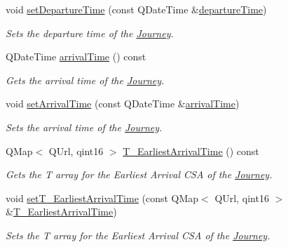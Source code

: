 \begin{DoxyCompactItemize}
void \mbox{\hyperlink{classQRail_1_1RouterEngine_1_1Journey_a4a03bbbfcbdc80e1d040598959ae4743}{set\+Departure\+Time}} (const Q\+Date\+Time \&\mbox{\hyperlink{classQRail_1_1RouterEngine_1_1Journey_a58b92b24d9d29ebb3cb47994b92eaa13}{departure\+Time}})
\begin{DoxyCompactList}\small\item\em Sets the departure time of the \mbox{\hyperlink{classQRail_1_1RouterEngine_1_1Journey}{Journey}}. \end{DoxyCompactList}\item 
Q\+Date\+Time \mbox{\hyperlink{classQRail_1_1RouterEngine_1_1Journey_a8a4e6733fceea2902fc3b0f5cb6b077c}{arrival\+Time}} () const
\begin{DoxyCompactList}\small\item\em Gets the arrival time of the \mbox{\hyperlink{classQRail_1_1RouterEngine_1_1Journey}{Journey}}. \end{DoxyCompactList}\item 
void \mbox{\hyperlink{classQRail_1_1RouterEngine_1_1Journey_aed24efbeb5390322b6b2bde3034cbe88}{set\+Arrival\+Time}} (const Q\+Date\+Time \&\mbox{\hyperlink{classQRail_1_1RouterEngine_1_1Journey_a8a4e6733fceea2902fc3b0f5cb6b077c}{arrival\+Time}})
\begin{DoxyCompactList}\small\item\em Sets the arrival time of the \mbox{\hyperlink{classQRail_1_1RouterEngine_1_1Journey}{Journey}}. \end{DoxyCompactList}\item 
Q\+Map$<$ Q\+Url, qint16 $>$ \mbox{\hyperlink{classQRail_1_1RouterEngine_1_1Journey_a2c6e80f1152cc373c95361db4fe295e4}{T\+\_\+\+Earliest\+Arrival\+Time}} () const
\begin{DoxyCompactList}\small\item\em Gets the T array for the Earliest Arrival C\+SA of the \mbox{\hyperlink{classQRail_1_1RouterEngine_1_1Journey}{Journey}}. \end{DoxyCompactList}\item 
void \mbox{\hyperlink{classQRail_1_1RouterEngine_1_1Journey_af477bba913bb4326528a2f9dcd2b2e82}{set\+T\+\_\+\+Earliest\+Arrival\+Time}} (const Q\+Map$<$ Q\+Url, qint16 $>$ \&\mbox{\hyperlink{classQRail_1_1RouterEngine_1_1Journey_a2c6e80f1152cc373c95361db4fe295e4}{T\+\_\+\+Earliest\+Arrival\+Time}})
\begin{DoxyCompactList}\small\item\em Sets the T array for the Earliest Arrival C\+SA of the \mbox{\hyperlink{classQRail_1_1RouterEngine_1_1Journey}{Journey}}. \end{DoxyCompactList}\item 

\end{DoxyCompactItemize}
